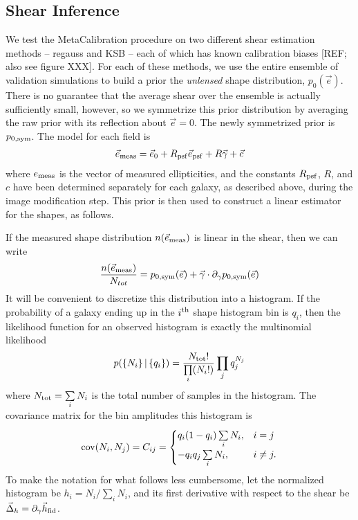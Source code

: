 \documentclass[iop]{emulateapj}
\begin{document}
\subsection{Shear Inference}
We test the MetaCalibration procedure on two different shear estimation methods -- {\sc regauss} and {\sc KSB} -- each of which has known calibration biases [REF; also see figure XXX]. For each of these methods, we use the entire ensemble of validation simulations to build a prior the {\it unlensed} shape distribution, $p_0(\vec{e})$. There is no guarantee that the average shear over the ensemble is actually sufficiently small, however, so we symmetrize this prior distribution by averaging the raw prior with its reflection about $\vec{e}=0$. The newly symmetrized prior is $p_{0,\rm sym}$. The model for each field is
\begin{align}
\vec{e}_{\rm meas} = \vec{e}_{0} + R_{\rm psf} \vec{e}_{\rm psf} + R\vec{\gamma} + \vec{c}
\label{eqn:edist_model}
\end{align}
where $e_{\rm meas}$ is the vector of measured ellipticities, and the constants $R_{\rm psf}$, $R$, and $c$ have been determined separately for each galaxy, as described above, during the image modification step. This prior is then used to construct a linear estimator for the shapes, as follows.

If the measured shape distribution $n(\vec{e}_{\rm meas})$ is linear in the shear, then we can write
\begin{align}
\frac{n(\vec{e}_{\rm meas})}{N_{tot}} = p_{0,\rm sym}(\vec{e}) + \vec{\gamma}\cdot \partial_{\gamma} p_{0,\rm sym}(\vec{e})
\end{align}
It will be convenient to discretize this distribution into a histogram. If the probability of a galaxy ending up in the $i^{\rm th}$ shape histogram bin is $q_i$, then the likelihood function for an observed histogram is exactly the multinomial likelihood
\begin{align}
p( \left\{N_i\right\} |\left\{ q_i\right\} ) = \frac{N_{\rm tot}!}{\prod\limits_i (N_i!)}\prod\limits_j q_j^{N_j}
\label{eqn:multnomial}
\end{align}
where $N_{\rm tot} = \sum\limits_i N_i$ is the total number of samples in the histogram.
The covariance matrix for the bin amplitudes this histogram is
\begin{align}
{\rm cov}(N_i, N_j) = C_{ij} = \begin{cases}
  q_i(1-q_i)\sum\limits_i N_i, & i=j \\
  -q_iq_j \sum\limits_i N_i, & i \neq j.
\end{cases}
\end{align}
To make the notation for what follows less cumbersome, let the normalized histogram be $h_i = N_i / \sum\limits_i N_i$, and its first derivative with respect to the shear be $\vec{\Delta}_h=\partial_{\gamma}\vec{h}_{\rm fid}$.
\end{document}
